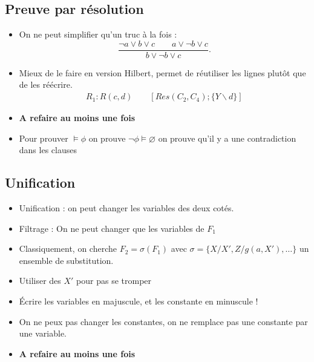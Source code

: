 \documentclass{article}
\theoremstyle{plain}%
\theoremstyle{definition}
\theoremstyle{remark}
\begin{document}
\subsection{Preuve par résolution}
\begin{itemize}
    \item On ne peut simplifier qu'un truc à la fois : 
        \[
            \frac{\neg a \vee b \vee c \qquad a \vee \neg b \vee c }{b \vee \neg b \vee c}
        .\]
    \item Mieux de le faire en version Hilbert, permet de réutiliser les lignes plutôt que de les réécrire.
        \begin{align*}
            R_1 : R(c,d) \qquad [Res(C_2, C_4) ; \{Y\backslash d\}]
        \end{align*}
    \item \textbf{A refaire au moins une fois}
    \item Pour prouver $ \models \phi $ on prouve $ \neg \phi \models \varnothing $ on prouve qu'il y a une contradiction dans les clauses 
\end{itemize}

\subsection{Unification}
\begin{itemize}
    \item Unification : on peut changer les variables des deux cotés. 
    \item Filtrage : On ne peut changer que les variables de $ F_1 $ 
    \item Classiquement, on cherche $ F_2 = \sigma (F_1) $ avec $ \sigma = \{X/X', Z/g(a, X'), \dots \}$ un ensemble de substitution.
    \item Utiliser des $ X \prime  $ pour pas se tromper
    \item Écrire les variables en majuscule, et les constante en minuscule !
    \item On ne peux pas changer les constantes, on ne remplace pas une constante par une variable.
    \item \textbf{A refaire au moins une fois}
\end{itemize}
\end{document}
